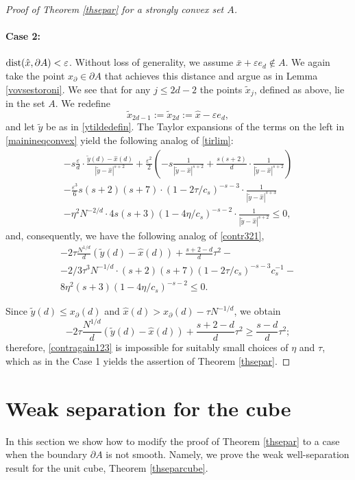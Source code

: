\documentclass[12pt]{amsart}
\theoremstyle{definition}
\def\ep{\varepsilon}
\newcommand{\1}{\mathbf{1}}
\begin{document}
\begin{proof}[Proof of Theorem \ref{thsepar} for a strongly convex set $A$]
\bigskip

\paragraph{\bf{Case 2:}} $\textup{dist}(\hat{x}, \partial A)<\ep$. Without loss of generality, we assume $\bar{x}+\ep e_d\not\in A$. We again take the point $x_\partial \in \partial A$ that achieves this distance and argue as in Lemma \ref{vovsestoroni}. We see that for any $j\leqslant 2d-2$ the points $\tilde{x}_j$, defined as above, lie in the set $A$. We redefine
$$
\tilde{x}_{2d-1}:=\tilde{x}_{2d}:=\hat{x} - \ep e_d,
$$
and let $\tilde{y}$ be as in \eqref{ytildedefin}.
The Taylor expansions of the terms on the left in \eqref{mainineqconvex} yield the following analog of \eqref{tirlim}:
\begin{multline}\label{blahblah123}
-s\frac{\ep}d \cdot \frac{\tilde y(d)-\hat{x}(d)}{|\tilde y - \hat{x}|^{s+2}}+\frac{\ep^2}2 \left(-s\frac{1}{|\tilde{y}-\hat{x}|^{s+2}}+\frac{s(s+2)}{d}\cdot \frac{1}{|\tilde y-\hat{x}|^{s+2}}\right) \\
-\frac{\ep^3}6 s(s+2)(s+7) \cdot (1-2\tau/c_s)^{-s-3}\cdot \frac{1}{|\tilde y-\hat{x}|^{s+3}}  \\ 
-\eta^2 N^{-2/d}\cdot 4s (s+3)(1-4\eta/c_s)^{-s-2}\cdot \frac{1}{|\tilde y-\hat{x}|^{s+2}}\leqslant 0,
\end{multline}
and, consequently, we have the following analog of \eqref{contr321},
\begin{multline}\label{contragain123}
-2\tau \frac{N^{1/d}}d (\tilde{y}(d)-\hat{x}(d))+ \frac{s+2-d}{d}\tau^2- \\ -2/3\tau^3 N^{-1/d}\cdot (s+2)(s+7)(1-2\tau/c_s)^{-s-3}c_s^{-1}- \\ 8\eta^2 (s+3)(1-4\eta/c_s)^{-s-2} \leqslant 0.
\end{multline}

Since $\tilde{y}(d)\leqslant x_\partial(d)$ and $\hat{x}(d)>x_\partial(d)-\tau N^{-1/d}$, we obtain
$$
-2\tau \frac{N^{1/d}}d (\tilde{y}(d)-\hat{x}(d))+ \frac{s+2-d}{d}\tau^2 \geqslant \frac{s-d}{d}\tau^2;
$$
therefore, \eqref{contragain123} is impossible for suitably small choices of $\eta$ and $\tau$, which as in the Case 1 yields the assertion of Theorem \ref{thsepar}.
\end{proof}






\section{Weak separation for the cube}\label{sectioncube}
In this section we show how to modify the proof of Theorem \ref{thsepar} to a case when the boundary $\partial A$ is not smooth. Namely, we prove the weak well-separation result for the unit cube, Theorem \ref{thseparcube}.
\end{document}
